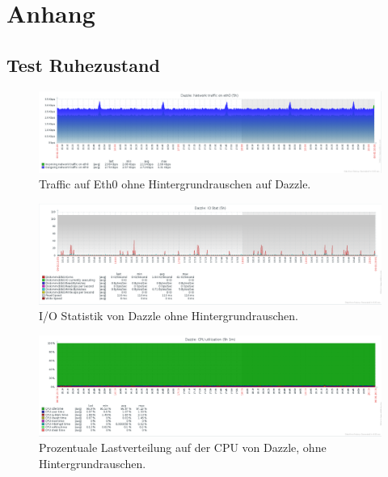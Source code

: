 \chapter{Anhang}
\label{cha:anhang}

\section{Test Ruhezustand}

\begin{figure}[htbp]
\centering
\includegraphics*[width=1\linewidth]{Abb/ZabbixDazzle/NoTraffic/DazzleNoTrafficEth0}

\caption{Traffic auf Eth0 ohne Hintergrundrauschen auf Dazzle.}
\label{fig:Eth0DazzleNotraffic}
\end{figure}


\begin{figure}[htbp]
\centering
\includegraphics*[width=0.9\linewidth]{Abb/ZabbixDazzle/NoTraffic/DazzleNoTrafficIoStat}

\caption{I/O Statistik von Dazzle ohne Hintergrundrauschen.}
\label{fig:IoStatDazzleNotraffic}
\end{figure} %

\begin{figure}[htbp]
\centering
\includegraphics*[width=0.9\linewidth]{Abb/ZabbixDazzle/NoTraffic/DazzleNoTrafficCPU}

\caption{Prozentuale Lastverteilung auf der CPU von Dazzle, ohne Hintergrundrauschen.}
\label{fig:CPUDazzleNotraffic}
\end{figure}
\FloatBarrier
